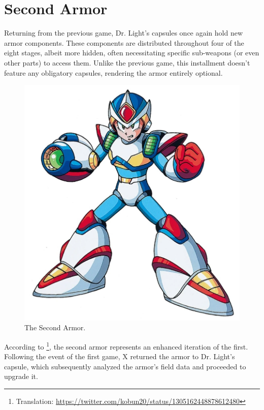 \section{Second Armor}\label{X2:Armor}
Returning from the previous game, Dr. Light's capsules once again hold new armor components. These components are distributed throughout four of the eight stages, albeit more hidden, often necessitating specific sub-weapons (or even other parts) to access them. Unlike the previous game, this installment doesn't feature any obligatory capsules, rendering the armor entirely optional.
\begin{figure}[htp]
	\centering
	\includegraphics[height=\portraitsize]{figures/X2/X2armor.png}
	\caption{The Second Armor.}
\end{figure}
According to \cite{tw:second_armor}\footnote{Translation: \url{https://twitter.com/kobun20/status/1305162448878612480}}, the second armor represents an enhanced iteration of the first. Following the event of the first game, X returned the armor to Dr. Light's capsule, which subsequently analyzed the armor's field data and proceeded to upgrade it.

